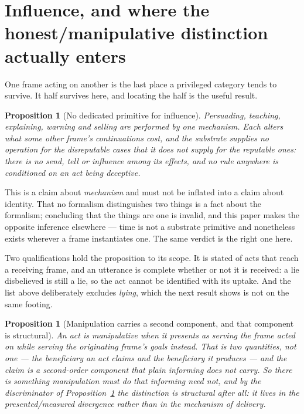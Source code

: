 \documentclass[11pt,a4paper]{article}
\newtheorem{proposition}[definition]{Proposition}
\theoremstyle{remark}\newtheorem{remark}[definition]{Remark}
\begin{document}
\section{Influence, and where the honest/manipulative distinction actually enters}\label{sec:communication}

One frame acting on another is the last place a privileged category tends to survive. It half
survives here, and locating the half is the useful result.

\begin{proposition}[No dedicated primitive for influence]\label{prop:one-influence}
Persuading, teaching, explaining, warning and selling are performed by one mechanism. Each alters
what some other frame's continuations cost, and the substrate supplies no operation for the
disreputable cases that it does not supply for the reputable ones: there is no send, tell or
influence among its effects, and no rule anywhere is conditioned on an act being deceptive.
\end{proposition}

This is a claim about \emph{mechanism} and must not be inflated into a claim about identity.
That no formalism distinguishes two things is a fact about the
formalism; concluding that the things are one is invalid, and this paper makes the opposite
inference elsewhere --- time is not a substrate primitive and nonetheless exists wherever a frame
instantiates one. The same verdict is the right one here.

Two qualifications hold the proposition to its scope. It is stated of acts that reach a receiving
frame, and an utterance is complete whether or not it is received: a lie disbelieved is still a lie,
so the act cannot be identified with its uptake. And the list above deliberately excludes
\emph{lying}, which the next result shows is not on the same footing.

\begin{proposition}[Manipulation carries a second component, and that component is structural]\label{prop:manipulation-structural}
An act is manipulative when it \emph{presents as} serving the frame acted on while serving the
originating frame's goals instead. That is two quantities, not one --- the beneficiary an act claims
and the beneficiary it produces --- and the claim is a second-order component that plain informing
does not carry. So there is something manipulation must do that informing need not, and by the
discriminator of Proposition~\ref{prop:one-influence} the distinction is structural after all: it
lives in the presented/measured divergence rather than in the mechanism of delivery.
\end{proposition}
\end{document}
